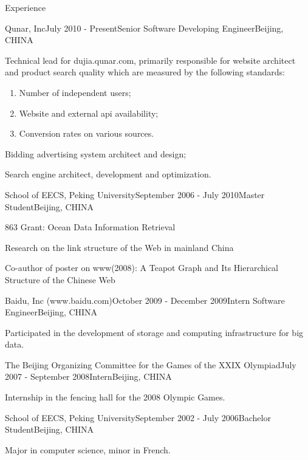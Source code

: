 \documentclass{resume} %
\begin{document}
\begin{rSection}{Experience}

\begin{rSubsection}{Qunar, Inc}{July 2010 - Present}{Senior Software Developing Engineer}{Beijing, CHINA}
\item Technical lead for dujia.qunar.com, primarily responsible for website architect and product search quality which are measured by the following standards:
  \begin{enumerate}
    \item Number of independent users;
    \item Website and external api availability;
    \item Conversion rates on various sources.
  \end{enumerate}
\item Bidding advertising system architect and design;
\item Search engine architect, development and optimization.
\end{rSubsection}


\begin{rSubsection}{School of EECS, Peking University}{September 2006 - July 2010}{Master Student}{Beijing, CHINA}
\item 863 Grant: Ocean Data Information Retrieval
\item Research on the link structure of the Web in mainland China
\item Co-author of poster on www(2008): A Teapot Graph and Its Hierarchical Structure of the Chinese Web
\end{rSubsection}


\begin{rSubsection}{Baidu, Inc (www.baidu.com)}{October 2009 - December 2009}{Intern Software Engineer}{Beijing, CHINA}
\item Participated in the development of storage and computing infrastructure for big data.
\end{rSubsection}

\begin{rSubsection}{The Beijing Organizing Committee for the Games of the XXIX Olympiad}{July 2007 - September 2008}{Intern}{Beijing, CHINA}
\item Internship in the fencing hall for the 2008 Olympic Games.
\end{rSubsection}


\begin{rSubsection}{School of EECS, Peking University}{September 2002 - July 2006}{Bachelor Student}{Beijing, CHINA}
\item Major in computer science, minor in French.
\end{rSubsection}


\end{rSection}
\end{document}
